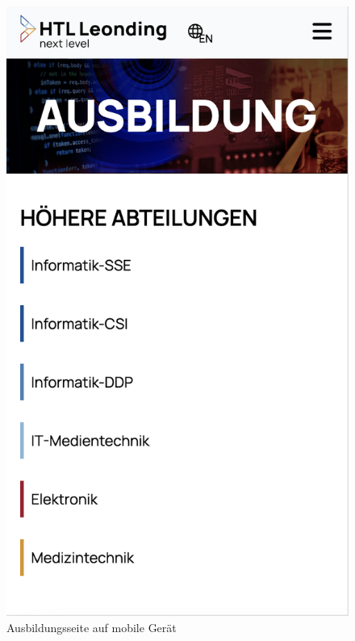 \begin{figure}
\begin{minipage}[b]{.4\linewidth}
      \includegraphics[width=\linewidth]{pics/ausbildung mobile.png}
      \caption{Ausbildungsseite auf mobile Gerät}
      \label{fig:impl:mobile:ausbildung}
   \end{minipage}
\end{figure}